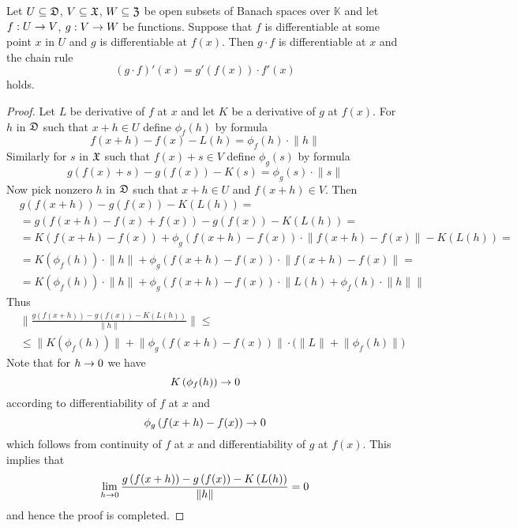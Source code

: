\begin{theorem}\label{theorem:chain_rule_for_differentiable}
Let $U\subseteq {\mathfrak D}$, $V\subseteq {\mathfrak X}$, $W\subseteq {\mathfrak Z}$ be open subsets of Banach spaces over $\mathbb{K}$ and let $f:U\rightarrow V$, $g:V\rightarrow W$ be functions. Suppose that $f$ is differentiable at some point $x$ in $U$ and $g$ is differentiable at $f(x)$. Then $g\cdot f$ is differentiable at $x$ and the chain rule
$$\left(g\cdot f\right)'(x) = g'\left(f(x)\right)\cdot f'(x)$$
holds.
\end{theorem}
\begin{proof}
Let $L$ be derivative of $f$ at $x$ and let $K$ be a derivative of $g$ at $f(x)$. For $h$ in ${\mathfrak D}$ such that $x+h\in U$ define $\phi_f(h)$ by formula
$$f(x + h) - f(x) - L(h) = \phi_f(h)\cdot \lVert h\rVert$$
Similarly for $s$ in ${\mathfrak X}$ such that $f(x) + s \in V$ define $\phi_g(s)$ by formula
$$g(f(x) + s) - g(f(x)) - K(s) = \phi_g(s)\cdot \lVert s \rVert$$
Now pick nonzero $h$ in ${\mathfrak D}$ such that $x+h \in U$ and $f(x + h) \in V$. Then
\begin{align*}
& g\left(f(x+h)\right)- g\left(f(x)\right) - K\left(L(h)\right) = \\
& = g\left(f(x + h) - f(x) + f(x)\right) - g\left(f(x)\right) - K\left(L(h)\right) = \\
&= K\left(f(x + h) - f(x)\right) + \phi_g\left(f(x + h) - f(x)\right)\cdot \lVert f(x + h) - f(x)\rVert - K\left(L(h)\right) =\\
&= K\left(\phi_f(h)\right)\cdot \lVert h\rVert + \phi_g\left(f(x + h) - f(x)\right)\cdot \lVert f(x + h) - f(x)\rVert  =\\
&= K\left(\phi_f(h)\right)\cdot \lVert h\rVert + \phi_g\left(f(x + h) - f(x)\right)\cdot \lVert L(h) + \phi_f(h)\cdot \lVert h\rVert \rVert
\end{align*}
Thus
\begin{align*}
&\bigg\lVert \frac{g\left(f(x+h)\right)- g\left(f(x)\right) - K\left(L(h)\right)}{\lVert h \rVert}\bigg\rVert \leq \\
& \leq \bigg\lVert K\left(\phi_f(h)\right)\bigg\rVert  + \lVert \phi_g\left(f(x + h) - f(x)\right)\rVert \cdot \big(\lVert L \rVert  + \lVert \phi_f(h)\rVert \big)
\end{align*}
Note that for $h\rightarrow 0$ we have
$$K\left(\phi_f(h)\right) \rightarrow 0$$
according to differentiability of $f$ at $x$ and 
$$\phi_g\left(f(x + h) - f(x)\right) \rightarrow 0$$
which follows from continuity of $f$ at $x$ and differentiability of $g$ at $f(x)$. This implies that
$$\lim_{h\rightarrow 0}\frac{g\left(f(x+h)\right)- g\left(f(x)\right) - K\left(L(h)\right)}{\lVert h \rVert} = 0$$
and hence the proof is completed.
\end{proof}

